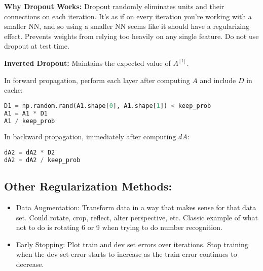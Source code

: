\textbf{Why Dropout Works:} Dropout randomly eliminates units and their connections on each iteration. It's as if on every iteration you're working with a smaller NN, and so using a smaller NN seems like it should have a regularizing effect. Prevents weights from relying too heavily on any single feature. Do not use dropout at test time.

\textbf{Inverted Dropout:} Maintains the expected value of $A^{[l]}$.

In forward propagation, perform each layer after computing $A$ and include $D$ in cache:
\vspace{-1.5mm}
\begin{lstlisting}[language=Python]
D1 = np.random.rand(A1.shape[0], A1.shape[1]) < keep_prob
A1 = A1 * D1  
A1 / keep_prob
\end{lstlisting}
\vspace{-1.5mm}
In backward propagation, immediately after computing $dA$:
\vspace{-1.5mm}
\begin{lstlisting}[language=Python]
dA2 = dA2 * D2
dA2 = dA2 / keep_prob 
\end{lstlisting}

\subsection{Other Regularization Methods:}

\begin{itemize}[wide, labelwidth=!, labelindent=0pt]
\itemsep0em 
    \item Data Augmentation: Transform data in a way that makes sense for that data set. Could rotate, crop, reflect, alter perspective, etc. Classic example of what not to do is rotating 6 or 9 when trying to do number recognition.
    \item Early Stopping: Plot train and dev set errors over iterations. Stop training when the dev set error starts to increase as the train error continues to decrease. \vspace*{-\baselineskip}
\end{itemize}




